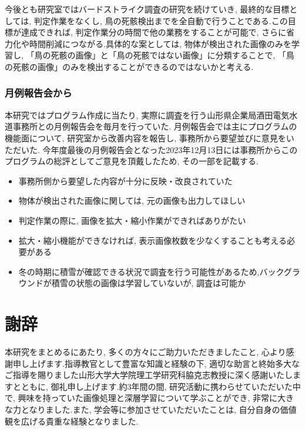 \documentclass[dvipdfmx]{jsarticle}
\begin{document}
今後とも研究室ではバードストライク調査の研究を続けていき, 最終的な目標としては, 判定作業をなくし, 鳥の死骸検出までを全自動で行うことである.この目標が達成できれば, 判定作業分の時間で他の業務をすることが可能で, さらに省力化や時間削減につながる.具体的な案としては, 物体が検出された画像のみを学習し, 「鳥の死骸の画像」と「鳥の死骸ではない画像」に分類することで, 「鳥の死骸の画像」のみを検出することができるのではないかと考える.


\subsubsection{月例報告会から}\label{feedback}
本研究ではプログラム作成に当たり, 実際に調査を行う山形県企業局酒田電気水道事務所との月例報告会を毎月を行っていた.
月例報告会では主にプログラムの機能面について, 研究室から改善内容を報告し, 事務所から要望並びに意見をいただいた.
今年度最後の月例報告会となった2023年12月13日には事務所からこのプログラムの総評としてご意見を頂戴したため, その一部を記載する.

\begin{itemize}
    \item 事務所側から要望した内容が十分に反映・改良されていた

    \item 物体が検出された画像に関しては, 元の画像も出力してほしい

    \item 判定作業の際に, 画像を拡大・縮小作業ができればありがたい

    \item 拡大・縮小機能ができなければ, 表示画像枚数を少なくすることも考える必要がある

    \item 冬の時期に積雪が確認できる状況で調査を行う可能性があるため,バックグラウンドが積雪の状態の画像は学習していないが, 調査は可能か
    
\end{itemize}


\section{謝辞}
本研究をまとめるにあたり, 多くの方々にご助力いただきましたこと, 心より感謝申し上げます.指導教官として豊富な知識と経験の下, 適切な助言と終始多大なご指導を賜りました山形大学大学院理工学研究科脇克志教授に深く感謝いたしますとともに, 御礼申し上げます.約3年間の間, 研究活動に携わらせていただいた中で, 興味を持っていた画像処理と深層学習について学ぶことができ, 非常に大きな力となりました.また, 学会等に参加させていただいたことは, 自分自身の価値観を広げる貴重な経験となりました.
\end{document}
